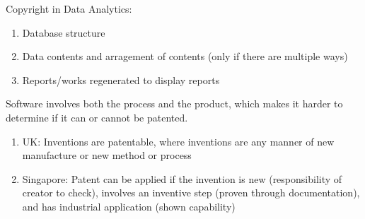 \documentclass[12pt, a4paper]{article}
\begin{document}
\begin{multicols*}{3}
Copyright in Data Analytics:
\begin{enumerate}[\roman*.]
  \item Database structure
  \item Data contents and arragement of contents (only if there are multiple ways)
  \item Reports/works regenerated to display reports
\end{enumerate}
\colbreak
Software involves both the process and the product, which makes it harder to determine if it can or cannot be patented.
\begin{enumerate}[\roman*.]
  \item UK: Inventions are patentable, where inventions are any manner of new manufacture or new method or process 
  \item Singapore: Patent can be applied if the invention is new (responsibility of creator to check), involves an inventive step (proven through documentation), and has industrial application (shown capability)
\end{enumerate}

\end{multicols*}
\end{document}
